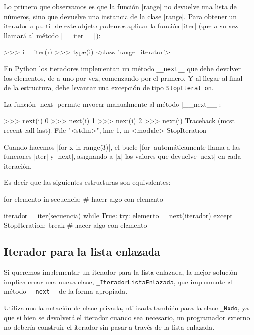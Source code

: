 Lo primero que observamos es que la función |range| no devuelve una lista de
números, sino que devuelve una instancia de la clase |range|. Para obtener un
iterador a partir de este objeto podemos aplicar la función |iter| (que a su
vez llamará al método |__iter__|):

\begin{codigo-python-sn}
>>> i = iter(r)
>>> type(i)
<class 'range_iterator'>
\end{codigo-python-sn}

En Python los iteradores implementan un método
\lstinline!__next__! que debe devolver los elementos, de a uno por vez,
comenzando por el primero.  Y al llegar al final de la estructura, debe
levantar una excepción de tipo \lstinline!StopIteration!.

La función |next| permite invocar manualmente al método |__next__|:

\begin{codigo-python-sn}
>>> next(i)
0
>>> next(i)
1
>>> next(i)
2
>>> next(i)
Traceback (most recent call last):
  File "<stdin>", line 1, in <module>
StopIteration
\end{codigo-python-sn}

Cuando hacemos |for x in range(3)|, el bucle |for| automáticamente llama a las
funciones |iter| y |next|, asignando a |x| los valores que devuelve |next| en
cada iteración.

Es decir que las siguientes estructuras son equivalentes:

\begin{codigo-python-sn}
for elemento in secuencia:
	# hacer algo con elemento
\end{codigo-python-sn}

\begin{codigo-python-sn}
iterador = iter(secuencia)
while True:
    try:
        elemento = next(iterador)
    except StopIteration:
        break
    # hacer algo con elemento
\end{codigo-python-sn}

\subsection*{Iterador para la lista enlazada}

Si queremos implementar un iterador para la lista enlazada,
la mejor solución implica crear una nueva clase,
\lstinline!_IteradorListaEnlazada!, que implemente el método
\lstinline!__next__! de la forma apropiada.

\begin{atencion}
Utilizamos la notación de clase privada, utilizada también para la clase
\lstinline!_Nodo!, ya que si bien se devolverá el iterador cuando sea
necesario, un programador externo no debería construir el iterador sin
pasar a través de la lista enlazada.
\end{atencion}

